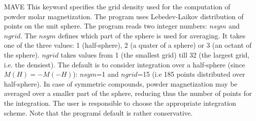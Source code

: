 \begin{keywordlist}


\item[MAVE]
This keyword specifies the grid density used for the computation of powder molar
magnetization. The program uses Lebedev-Laikov distribution of points on the unit sphere.
The program reads two integer numbers: $nsym$ and $ngrid$. The $nsym$ defines which
part of the sphere is used for averaging. It takes one of the three values: 1 (half-sphere),
2 (a quater of a sphere) or 3 (an octant of the sphere). $ngrid$ takes values from 1
(the smallest grid) till 32 (the largest grid, i.e. the densiest). The default is to
consider integration over a half-sphere (since $M(H)=-M(-H)$): $nsym$=1 and $ngrid$=15
(i.e 185 points distributed over half-sphere). In case of symmetric compounds, powder
magnetization may be averaged over a smaller part of the sphere, reducing thus the number
of points for the integration. The user is responsible to choose the appropriate integration scheme.
Note that the program\'s default is rather conservative.





\end{keywordlist}
